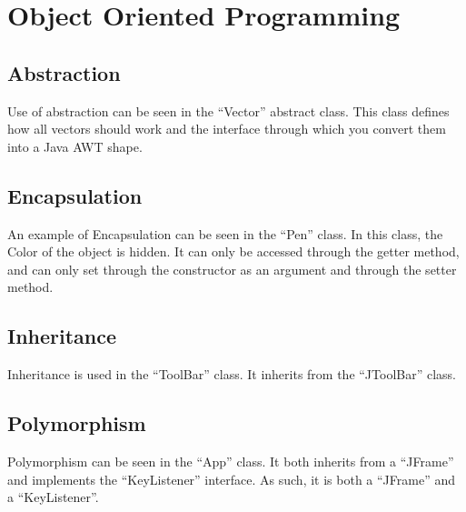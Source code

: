 \section{Object Oriented Programming}
\subsection{Abstraction}
Use of abstraction can be seen in the ``Vector'' abstract class.
This class defines how all vectors should work and the interface through which you convert them into a Java AWT shape.
\subsection{Encapsulation}
An example of Encapsulation can be seen in the ``Pen'' class.
In this class, the Color of the object is hidden.
It can only be accessed through the getter method, and can only set through the constructor as an argument and through the setter method.
\subsection{Inheritance}
Inheritance is used in the ``ToolBar'' class. It inherits from the ``JToolBar'' class.
\subsection{Polymorphism}
Polymorphism can be seen in the ``App'' class. It both inherits from a ``JFrame'' and implements the ``KeyListener'' interface.
As such, it is both a ``JFrame'' and a ``KeyListener''.
